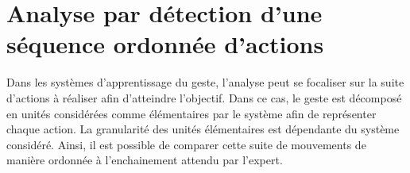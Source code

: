 \section{Analyse par détection d'une séquence ordonnée d'actions}
Dans les systèmes d'apprentissage du geste, l'analyse peut se focaliser sur la suite d'actions à réaliser afin d'atteindre l'objectif. Dans ce cas, le geste est décomposé en unités considérées comme élémentaires par le système afin de représenter chaque action. La granularité des unités élémentaires est dépendante du système considéré. Ainsi, il est possible de comparer cette suite de mouvements de manière ordonnée à l'enchainement attendu par l'expert.


